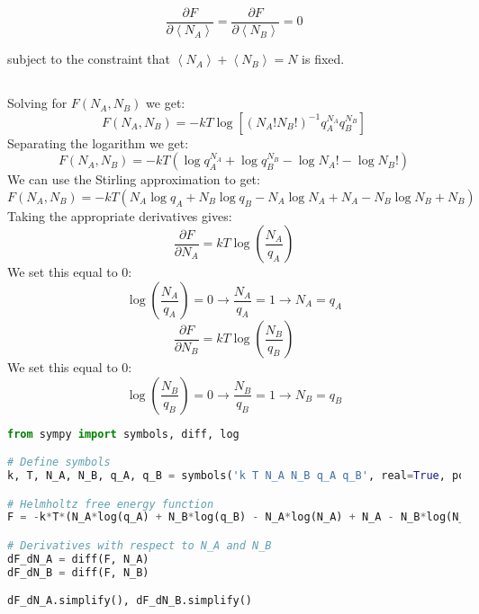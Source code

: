 \documentclass[12pt]{article}
\begin{document}
\begin{equation*}
\frac{\partial F}{\partial\left\langle N_{A}\right\rangle}=\frac{\partial F}{\partial\left\langle N_{B}\right\rangle}=0 \tag{5}
\end{equation*}


subject to the constraint that $\left\langle N_{A}\right\rangle+\left\langle N_{B}\right\rangle=N$ is fixed.
\subsection{}
Solving for $F(N_A, N_B)$ we get:
\begin{equation}
F(N_A, N_B) = -kT \log \left[\left(N_{A} ! N_{B} !\right)^{-1} q_{A}^{N_{A}} q_{B}^{N_{B}}\right]
\end{equation}
Separating the logarithm we get:
\begin{equation}
F(N_A, N_B) = -kT \left(\log{q_{A}^{N_{A}} } + \log{q_{B}^{N_{B}} } - \log{N_{A} ! } - \log{N_{B} ! }\right)
\end{equation}
We can use the Stirling approximation to get:
\begin{equation}
F(N_A, N_B) = -kT \left(N_{A} \log{q_{A}} + N_{B} \log{q_{B}} - N_{A} \log{N_{A}} + N_{A} - N_{B} \log{N_{B}} + N_{B}\right)
\end{equation}
Taking the appropriate derivatives gives:
\begin{equation}
\frac{\partial F}{\partial N_A} = kT \log\left(\frac{N_A}{q_A}\right)
\end{equation}
We set this equal to 0:
\begin{equation}
  \log\left(\frac{N_A}{q_A}\right) = 0 \rightarrow \frac{N_A}{q_A} = 1 \rightarrow N_A = q_A
\end{equation}
\begin{equation}
  \frac{\partial F}{\partial N_B} = kT \log\left(\frac{N_B}{q_B}\right)
\end{equation}
We set this equal to 0:
\begin{equation}
  \log\left(\frac{N_B}{q_B}\right) = 0 \rightarrow \frac{N_B}{q_B} = 1 \rightarrow N_B = q_B
\end{equation}
\begin{lstlisting}[language=Python]
from sympy import symbols, diff, log

# Define symbols
k, T, N_A, N_B, q_A, q_B = symbols('k T N_A N_B q_A q_B', real=True, positive=True)

# Helmholtz free energy function
F = -k*T*(N_A*log(q_A) + N_B*log(q_B) - N_A*log(N_A) + N_A - N_B*log(N_B) + N_B)

# Derivatives with respect to N_A and N_B
dF_dN_A = diff(F, N_A)
dF_dN_B = diff(F, N_B)

dF_dN_A.simplify(), dF_dN_B.simplify()

\end{lstlisting}
\end{document}
